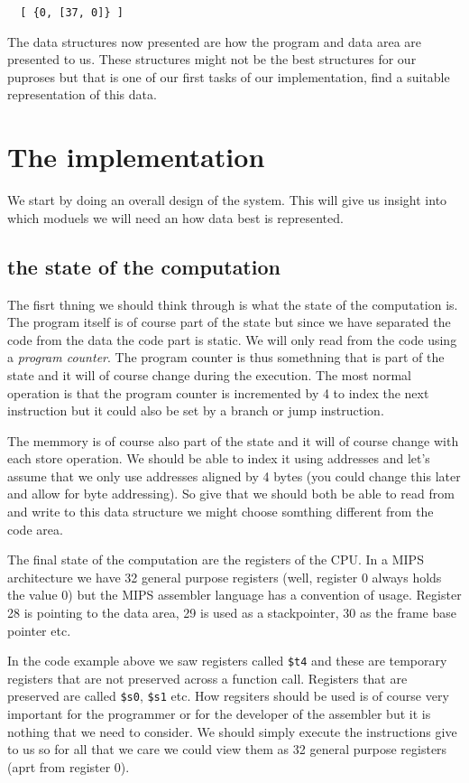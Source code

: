 \documentclass[a4paper,11pt]{article}
\begin{document}
\begin{verbatim}
  [ {0, [37, 0]} ]
\end{verbatim}

The data structures now presented are how the program and data area
are presented to us. These structures might not be the best structures
for our puproses but that is one of our first tasks of our
implementation, find a suitable representation of this data.

\section{The implementation}

We start by doing an overall design of the system. This will give us
insight into which moduels we will need an how data best is
represented.

\subsection{the state of the computation}

The fisrt thning we should think through is what the state of the
computation is. The program itself is of course part of the state but
since we have separated the code from the data the code part is
static. We will only read from the code using a {\em program
  counter}. The program counter is thus somethning that is part of the
state and it will of course change during the execution. The most
normal operation is that the program counter is incremented by 4 to
index the next instruction but it could also be set by a branch or
jump instruction.

The memmory is of course also part of the state and it will of course
change with each store operation. We should be able to index it using
addresses and let's assume that we only use addresses aligned by 4
bytes (you could change this later and allow for byte addressing). So
give that we should both be able to read from and write to this data
structure we might choose somthing different from the code area.

The final state of the computation are the registers of the CPU. In a
MIPS architecture we have 32 general purpose registers (well, register
0 always holds the value 0) but the MIPS assembler language has a
convention of usage. Register 28 is pointing to the data area, 29 is
used as a stackpointer, 30 as the frame base pointer etc.

In the code example above we saw registers called {\tt \$t4} and these
are temporary registers that are not preserved across a function
call. Registers that are preserved are called {\tt \$s0}, {\tt \$s1}
etc. How regsiters should be used is of course very important for the
programmer or for the developer of the assembler but it is nothing
that we need to consider. We should simply execute the instructions
give to us so for all that we care we could view them as 32 general
purpose registers (aprt from register 0).
\end{document}
